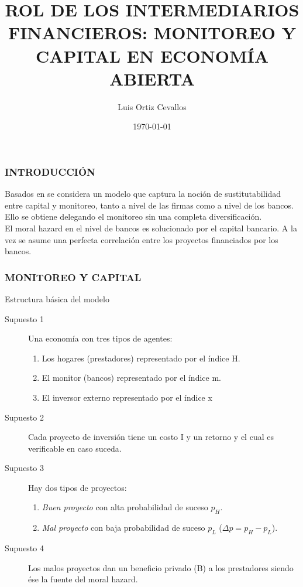 \documentclass[10pt, xcolor=table, x11names]{beamer}
\title[]{ROL DE LOS INTERMEDIARIOS FINANCIEROS: MONITOREO Y CAPITAL EN ECONOMÍA ABIERTA}
\author[Luis Ortiz]{Luis Ortiz Cevallos}
\institute[SECMCA]{\bf SECMCA}
\date[\today]{\footnotesize \today}
\begin{document}
\begin{frame}
\titlepage
\end{frame}




\begin{frame}
	\frametitle{{\normalsize INTRODUCCIÓN} {}}
Basados en  \cite{Tirole1997} se considera un modelo que captura la noción de sustitutabilidad entre capital y monitoreo, tanto a nivel de las firmas como a nivel de los bancos. Ello se obtiene delegando el monitoreo sin una completa diversificación. \\
El moral hazard en el nivel de bancos es solucionado por el capital bancario. A la vez se asume una perfecta correlación entre los proyectos financiados por los bancos.\\



 

\end{frame}

\begin{frame}
    \frametitle{{\normalsize MONITOREO Y CAPITAL} {}}
    
    \begin{block} {Estructura básica del modelo}
        \begin{description}
            \item[Supuesto 1]  Una economía con tres tipos de agentes:
            \begin{enumerate}
                \item Los hogares (prestadores) representado por el índice H.
                \item El monitor (bancos) representado por el índice m.
                \item El inversor externo  representado por el índice x
            \end{enumerate}  
            \item[Supuesto 2] Cada proyecto de inversión tiene un costo I y un retorno y el cual es verificable en caso suceda. 
            \item[Supuesto 3] Hay dos tipos de proyectos:
            \begin{enumerate}
               \item \textit{Buen proyecto} con alta probabilidad de suceso $p_{H}$.
               \item \textit{Mal proyecto} con baja probabilidad de suceso $p_{L}$ ($\Delta p= p_{H}-p_{L}$). 
            \end{enumerate}
            \item[Supuesto 4] Los malos proyectos dan un beneficio privado (B) a los prestadores siendo ése la fuente del moral hazard.
            
           
             
            \end{description}
        
    \end{block}	
    
\end{frame}
\end{document}

